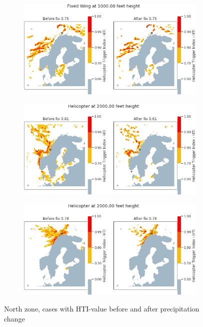 \begin{figure}[H]
    \begin{subfigure}{0.45\textwidth}
    \centering
    \includegraphics[width=\textwidth]{Figures/20.png}
    \caption{}
    \label{fig:HTI20}
    \end{subfigure}
\hfill
    \begin{subfigure}{0.45\textwidth}
    \centering
    \includegraphics[width=\textwidth]{Figures/25.png}
    \caption{}
    \label{fig:HTI25}
    \end{subfigure}
    \centering
    \begin{subfigure}{0.45\textwidth}
    \centering
    \includegraphics[width=\textwidth]{Figures/29.png}
    \caption{}
    \label{fig:HTI29}
    \end{subfigure}
\caption{North zone, cases with HTI-value before and after precipitation change}
\end{figure}

